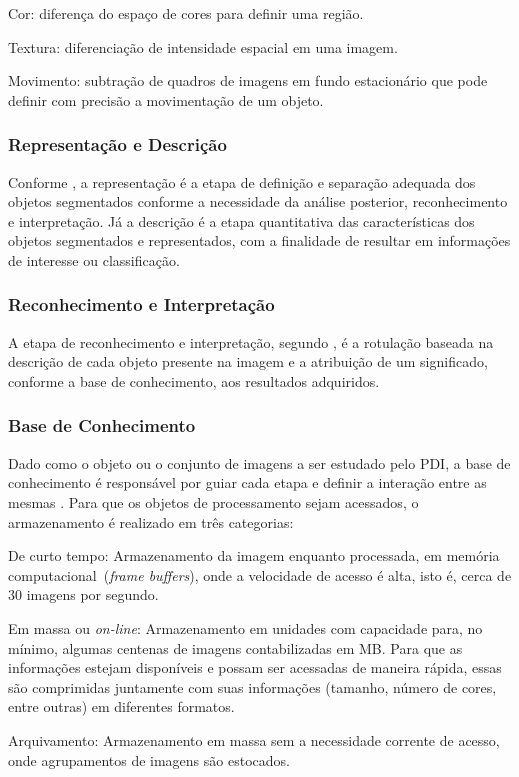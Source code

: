 \documentclass[12pt,oneside,a4paper,chapter=TITLE,section=TITLE,sumario=tradicional]{abntex2}
\begin{document}
\begin{lista}
    \item Cor: diferença do espaço de cores para definir uma região.
    \item Textura: diferenciação de intensidade espacial em uma imagem.
    \item Movimento: subtração de quadros de imagens em fundo estacionário que pode definir com precisão a movimentação de um objeto.
\end{lista}

\subsubsection{Representação e Descrição}

Conforme , a representação é a etapa de definição e separação adequada dos objetos segmentados conforme a necessidade da análise posterior, reconhecimento e interpretação. Já a descrição é a etapa quantitativa das características dos objetos segmentados e representados, com a finalidade de resultar em informações de interesse ou classificação.

\subsubsection{Reconhecimento e Interpretação}

A etapa de reconhecimento e interpretação, segundo , é a rotulação baseada na descrição de cada objeto presente na imagem e a atribuição de um significado, conforme a base de conhecimento, aos resultados adquiridos.

\subsubsection{Base de Conhecimento}

Dado como o objeto ou o conjunto de imagens a ser estudado pelo PDI, a base de conhecimento é responsável por guiar cada etapa e definir a interação entre as mesmas . Para que os objetos de processamento sejam acessados, o armazenamento é realizado em três categorias:

\begin{lista}
    \item De curto tempo: Armazenamento da imagem enquanto processada, em memória computacional~(\textit{frame buffers}), onde a velocidade de acesso é alta, isto é, cerca de 30 imagens por segundo.
    \item Em massa ou \textit{on-line}: Armazenamento em unidades com capacidade para, no mínimo, algumas centenas de imagens contabilizadas em MB. Para que as informações estejam disponíveis e possam ser acessadas de maneira rápida, essas são comprimidas juntamente com suas informações (tamanho, número de cores, entre outras) em diferentes formatos.
    \item Arquivamento: Armazenamento em massa sem a necessidade corrente de acesso, onde agrupamentos de imagens são estocados.
\end{lista}
\end{document}
